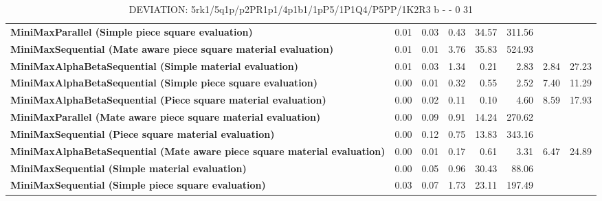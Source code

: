 \begin{table}[H]
{\begin{tabular}{|p{8cm}|*{7}{r|}}
\rowcolor[HTML]{FFFFFF}
\textbf{MiniMaxParallel (Simple piece square evaluation)}               & 0.01 & 0.03 & 0.43 & 34.57 & 311.56 &  &  \\

\rowcolor[HTML]{EFEFEF}
\textbf{MiniMaxSequential (Mate aware piece square material evaluation)}               & 0.01 & 0.01 & 3.76 & 35.83 & 524.93 &  &  \\

\rowcolor[HTML]{FFFFFF}
\textbf{MiniMaxAlphaBetaSequential (Simple material evaluation)}               & 0.01 & 0.03 & 1.34 & 0.21 & 2.83 & 2.84 & 27.23 \\

\rowcolor[HTML]{EFEFEF}
\textbf{MiniMaxAlphaBetaSequential (Simple piece square evaluation)}               & 0.00 & 0.01 & 0.32 & 0.55 & 2.52 & 7.40 & 11.29 \\

\rowcolor[HTML]{FFFFFF}
\textbf{MiniMaxAlphaBetaSequential (Piece square material evaluation)}               & 0.00 & 0.02 & 0.11 & 0.10 & 4.60 & 8.59 & 17.93 \\

\rowcolor[HTML]{EFEFEF}
\textbf{MiniMaxParallel (Mate aware piece square material evaluation)}               & 0.00 & 0.09 & 0.91 & 14.24 & 270.62 &  &  \\

\rowcolor[HTML]{FFFFFF}
\textbf{MiniMaxSequential (Piece square material evaluation)}               & 0.00 & 0.12 & 0.75 & 13.83 & 343.16 &  &  \\

\rowcolor[HTML]{EFEFEF}
\textbf{MiniMaxAlphaBetaSequential (Mate aware piece square material evaluation)}               & 0.00 & 0.01 & 0.17 & 0.61 & 3.31 & 6.47 & 24.89 \\

\rowcolor[HTML]{FFFFFF}
\textbf{MiniMaxSequential (Simple material evaluation)}               & 0.00 & 0.05 & 0.96 & 30.43 & 88.06 &  &  \\

\rowcolor[HTML]{EFEFEF}
\textbf{MiniMaxSequential (Simple piece square evaluation)}               & 0.03 & 0.07 & 1.73 & 23.11 & 197.49 &  &  \\

            \hline
        \end{tabular}%
    }
    \caption{DEVIATION: 5rk1/5q1p/p2PR1p1/4p1b1/1pP5/1P1Q4/P5PP/1K2R3 b - - 0 31}
    \label{tab:mid-game---deflection---short-deviation}
\end{table}
